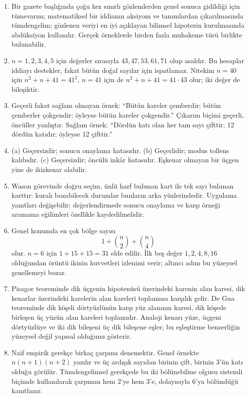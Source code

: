 \begin{enumerate}
\item Bir gazete başlığında çoğu kez sınırlı gözlemlerden genel sonuca gidildiği için tümevarım; matematiksel bir iddianın aksiyom ve tanımlardan çıkarılmasında tümdengelim; gözlenen veriyi en iyi açıklayan bilimsel hipotezin kurulmasında abdüksiyon kullanılır. Gerçek örneklerde birden fazla muhakeme türü birlikte bulunabilir.

\item $n=1,2,3,4,5$ için değerler sırasıyla $43,47,53,61,71$ olup asaldır. Bu hesaplar iddiayı destekler, fakat bütün doğal sayılar için ispatlamaz. Nitekim $n=40$ için $n^2+n+41=41^2$, $n=41$ için de $n^2+n+41=41\cdot43$ olur; iki değer de bileşiktir.

\item Geçerli fakat sağlam olmayan örnek: ``Bütün kareler çemberdir; bütün çemberler çokgendir; öyleyse bütün kareler çokgendir.'' Çıkarım biçimi geçerli, öncüller yanlıştır. Sağlam örnek: ``Dördün katı olan her tam sayı çifttir; 12 dördün katıdır; öyleyse 12 çifttir.''

\item (a) Geçersizdir; sonucu onaylama hatasıdır. (b) Geçerlidir; modus tollens kalıbıdır. (c) Geçersizdir; öncülü inkâr hatasıdır. Eşkenar olmayan bir üçgen yine de ikizkenar olabilir.

\item Wason görevinde doğru seçim, ünlü harf bulunan kart ile tek sayı bulunan karttır: kuralı bozabilecek durumlar bunların arka yüzlerindedir. Uygulama yanıtları değişebilir; değerlendirmede sonucu onaylama ve karşı örneği aramama eğilimleri özellikle kaydedilmelidir.

\item Genel konumda en çok bölge sayısı
\[
1+\binom{n}{2}+\binom{n}{4}
\]
olur. $n=6$ için $1+15+15=31$ elde edilir. İlk beş değer $1,2,4,8,16$ olduğundan örüntü ikinin kuvvetleri izlenimi verir; altıncı adım bu yüzeysel genellemeyi bozar.

\item Pisagor teoreminde dik üçgenin hipotenüsü üzerindeki karenin alan karesi, dik kenarlar üzerindeki karelerin alan kareleri toplamına karşılık gelir. De Gua teoreminde dik köşeli dörtyüzlünün karşı yüz alanının karesi, dik köşede birleşen üç yüzün alan kareleri toplamıdır. Analoji kenarı yüze, üçgeni dörtyüzlüye ve iki dik bileşeni üç dik bileşene eşler; bu eşleştirme benzerliğin yüzeysel değil yapısal olduğunu gösterir.

\item Naif empirik gerekçe birkaç çarpımı denemektir. Genel örnekte $n(n+1)(n+2)$ yazılır ve üç ardışık sayıdan birinin çift, birinin 3'ün katı olduğu görülür. Tümdengelimsel gerekçede bu iki bölünebilme olgusu sistemli biçimde kullanılarak çarpımın hem 2'ye hem 3'e, dolayısıyla 6'ya bölündüğü kanıtlanır.
\end{enumerate}

